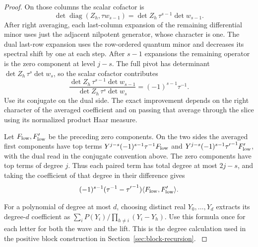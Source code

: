 \begin{proof}
On those columns the scalar cofactor is
\[
        \det\operatorname{diag}(Z_h,\tau w_{s-1})
              =\det Z_h\,\tau^{s-1}\det w_{s-1}.
\]
After right averaging, each last-column expansion of the
remaining differential minor uses just the adjacent
nilpotent generator, whose character is one. The dual
last-row expansion uses the row-ordered quantum minor
and decreases its spectral shift by one at each step.
After \(s-1\) expansions the remaining operator is
the zero component at level \(j-s\). The full pivot has
determinant \(\det Z_h\,\tau^s\det w_s\), so the scalar
cofactor contributes
\[
 \frac{\det Z_h\,\tau^{s-1}\det w_{s-1}}
      {\det Z_h\,\tau^s\det w_s}=(-1)^{s-1}\tau^{-1}.
\]
Use its conjugate on the dual side. The exact improvement
depends on the right character of the averaged
coefficient and on passing that average through the
slice using its normalized product Haar measure.

Let \(F_{\rm low},F'_{\rm low}\) be the preceding zero
components. On the two sides the averaged first components
have top terms \(Y^{j-s}(-1)^{s-1}\tau^{-1}F_{\rm low}\)
and \(Y^{j-s}(-1)^{s-1}{\tau'}^{-1}F'_{\rm low}\), with
the dual read in the conjugate convention above. The zero
components have top terms of degree \(j\). Thus each paired
term has total degree at most \(2j-s\), and taking the
coefficient of that degree in their difference gives
\begin{equation}\label{eq:word-leading-lift}
       (-1)^{s-1}(\tau^{-1}-{\tau'}^{-1})
                  \langle F_{\rm low},F'_{\rm low}\rangle .
\end{equation}

For a polynomial of degree at most \(d\), choosing distinct
real \(Y_0,\ldots,Y_d\) extracts its degree-\(d\) coefficient
as \(\sum_i P(Y_i)/\prod_{h\ne i}(Y_i-Y_h)\). Use this
formula once for each letter for both the wave and the lift. This is the degree calculation used
in the positive block construction in
Section~\ref{sec:block-recursion}.  \label{cor:word-pairing-5}
\end{proof}

